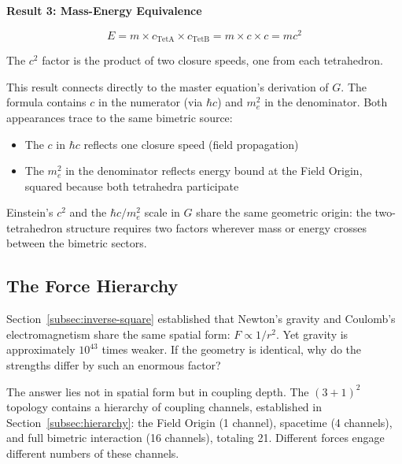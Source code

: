 \documentclass[aps,prd,preprint,superscriptaddress,showpacs,preprintnumbers,amsmath,amssymb,nofootinbib]{revtex4-2}
\begin{document}
\vspace{1.5em}
\noindent
\colorbox{resultgreen}{\parbox{\dimexpr\textwidth-2\fboxsep\relax}{%
\vspace{0.8em}
\centering
\textbf{\large Result 3: Mass-Energy Equivalence}

\vspace{0.5em}
\boldmath
\begin{equation}
E = m \times c_{\text{TetA}} \times c_{\text{TetB}} = m \times c \times c = mc^2
\end{equation}
\unboldmath

\vspace{0.3em}
The $c^2$ factor is the product of two closure speeds, one from each tetrahedron.
\vspace{0.5em}
}}
\vspace{1cm}

This result connects directly to the master equation's derivation of $G$. The formula contains $c$ in the numerator (via $\hbar c$) and $m_e^2$ in the denominator. Both appearances trace to the same bimetric source:

\begin{itemize}
\item The $c$ in $\hbar c$ reflects one closure speed (field propagation)
\item The $m_e^2$ in the denominator reflects energy bound at the Field Origin, squared because both tetrahedra participate
\end{itemize}

Einstein's $c^2$ and the $\hbar c/m_e^2$ scale in $G$ share the same geometric origin: the two-tetrahedron structure requires two factors wherever mass or energy crosses between the bimetric sectors.

\subsection{The Force Hierarchy}
\label{subsec:hierarchy-eq}

Section~\ref{subsec:inverse-square} established that Newton's gravity and Coulomb's electromagnetism share the same spatial form: $F \propto 1/r^2$. Yet gravity is approximately $10^{43}$ times weaker. If the geometry is identical, why do the strengths differ by such an enormous factor?

The answer lies not in spatial form but in coupling depth. The $(3+1)^2$ topology contains a hierarchy of coupling channels, established in Section~\ref{subsec:hierarchy}: the Field Origin (1 channel), spacetime (4 channels), and full bimetric interaction (16 channels), totaling 21. Different forces engage different numbers of these channels.
\end{document}
